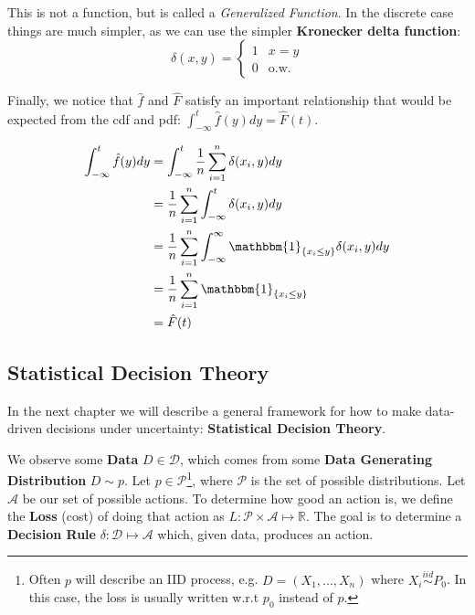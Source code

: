 \documentclass[]{article}
\theoremstyle{mattstyle}
\theoremstyle{definition}
\begin{document}
This is not a function, but is called a \emph{Generalized Function}. In the discrete case things are much simpler, as we can use the simpler \textbf{Kronecker delta function}:
\begin{equation}
\delta(x,y) = 
\begin{cases}
1 & x=y \\
0 & \text{o.w.}
\end{cases}
\end{equation}

Finally, we notice that $\hat{f}$ and $\hat{F}$ satisfy an important relationship that would be expected from the cdf and pdf: $\int_{-\infty}^{t}\hat{f}(y)dy = \hat{F}(t)$.

\begin{align*}
\int_{-\infty}^{t}\hat{f}(y)dy &= \int_{-\infty}^{t} \frac{1}{n}\sum_{i=1}^n \delta(x_i, y)dy\\
&= \frac{1}{n}\sum_{i=1}^n \int_{-\infty}^{t}  \delta(x_i, y)dy\\
&= \frac{1}{n}\sum_{i=1}^n \int_{-\infty}^{\infty} \mathbbm{1}_{\{x_i \le y\}} \delta(x_i, y)dy\\
&= \frac{1}{n}\sum_{i=1}^n \mathbbm{1}_{\{x_i \le y\}}\\
&= \hat{F}(t)
\end{align*}

\newpage

\subsection{Statistical Decision Theory}

In the next chapter we will describe a general framework for how to make data-driven decisions under uncertainty: \textbf{Statistical Decision Theory}.

We observe some \textbf{Data} \(D \in \mathcal{D}\), which comes from some \textbf{Data Generating Distribution} \(D \sim p\). Let \(p\in \mathcal{P}\)\footnote{Often $p$ will describe an IID process, e.g. $D = (X_1,...,X_n)$ where $X_i \overset{iid}\sim P_0$. In this case, the loss is usually written w.r.t $p_0$ instead of $p$.}, where \(\mathcal{P}\) is the set of possible distributions. Let \(\mathcal{A}\) be our set of possible actions. To determine how good an action is, we define the \textbf{Loss} (cost) of doing that action as \(L: \mathcal{P} \times \mathcal{A} \mapsto \mathbb{R}\). The goal is to determine a \textbf{Decision Rule} \(\delta: \mathcal{D} \mapsto \mathcal{A}\) which, given data, produces an action.
\end{document}
